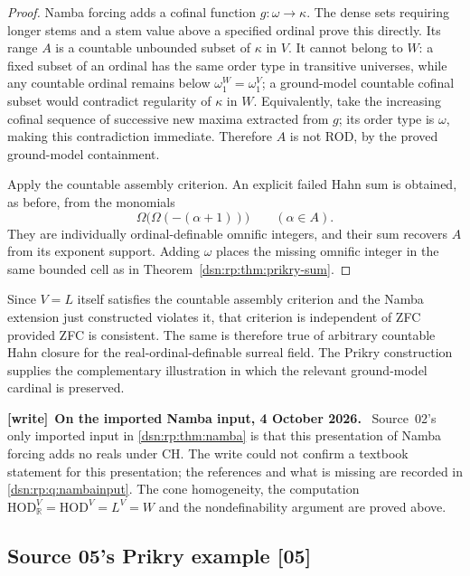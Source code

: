 \documentclass[11pt,a4paper]{article}
\numberwithin{equation}{section}
\theoremstyle{definition}
\theoremstyle{remark}
\newcommand{\HOD}{\mathrm{HOD}}
\newcommand{\R}{\mathbb R}
\newcommand{\src}[1]{\textup{\textsf{\small[#1]}}}
\newenvironment{writenote}[1][]{\par\medskip\begingroup\small\noindent\textbf{[write]}\if\relax\detokenize{#1}\relax\else~\textbf{#1.}\fi~\ignorespaces}{\par\endgroup\medskip}
\newcommand{\HR}{\HOD_{\R}}
\begin{document}
\begin{proof}
Namba forcing adds a cofinal function $g:\omega\to\kappa$.  The
dense sets requiring longer stems and a stem value above a specified
ordinal prove this directly.  Its range $A$ is a countable unbounded
subset of $\kappa$ in $V$.  It cannot belong to $W$: a fixed subset
of an ordinal has the same order type in transitive universes, while
any countable ordinal remains below $\omega_1^W=\omega_1^V$; a
ground-model countable cofinal subset would contradict regularity
of $\kappa$ in $W$.  Equivalently, take the increasing cofinal
sequence of successive new maxima extracted from $g$; its order
type is $\omega$, making this contradiction immediate.
Therefore $A$ is not ROD, by the proved ground-model containment.

Apply the countable assembly criterion.  An explicit failed Hahn sum
is obtained, as before, from the monomials
\[
 \Omega\bigl(\Omega(-(\alpha+1))\bigr)\qquad(\alpha\in A).
\]
They are individually ordinal-definable omnific integers, and their
sum recovers $A$ from its exponent support.  Adding $\omega$ places
the missing omnific integer in the same bounded cell as in
Theorem~\ref{dsn:rp:thm:prikry-sum}.
\end{proof}

Since $V=L$ itself satisfies the countable assembly criterion and
the Namba extension just constructed violates it, that criterion is
independent of ZFC provided ZFC is consistent.  The same is therefore
true of arbitrary countable Hahn closure for the real-ordinal-definable
surreal field.  The Prikry construction supplies the complementary
illustration in which the relevant ground-model cardinal is preserved.





\begin{writenote}[On the imported Namba input, 4 October 2026]
Source~02's only imported input in \cref{dsn:rp:thm:namba} is that this
presentation of Namba forcing adds no reals under CH. The write could not
confirm a textbook statement for this presentation; the references and what is
missing are recorded in \cref{dsn:rp:q:nambainput}. The cone homogeneity, the
computation $\HR^V=\HOD^V=L^V=W$ and the nondefinability argument are proved
above.
\end{writenote}

\subsection{Source 05's Prikry example \src{05}}
\label{dsn:ca:sec:prikry}
\end{document}
